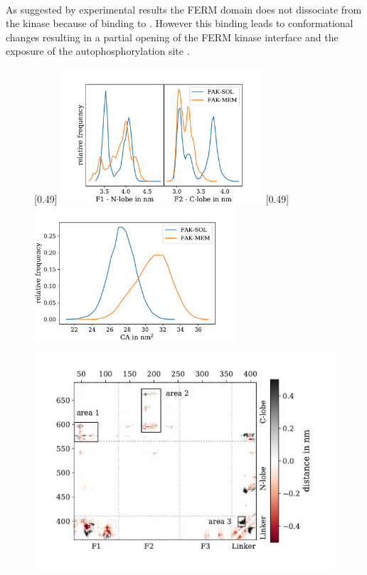 \\
As suggested by experimental results the FERM domain does not dissociate from the kinase because of binding to \pip{}. However this binding leads to conformational changes resulting in a partial opening of the FERM kinase interface and the exposure of the autophosphorylation site  \autocites{pap001}{pap003}.
%
%
%
\begin{figure}
	\subcaptionbox{\label{mem:comdist}}[0.49\textwidth]{
		\includegraphics[height=5cm]{figures/results/comp_free_mem_comdist}
	}\hfill%
	\subcaptionbox{\label{mem:contactarea}}[0.49\textwidth]{
		\includegraphics[height=5cm]{figures/results/ca_sol_mem}
	}%
\end{figure}
%
%
%
%
%
%
\begin{figure}
	\centering
	\includegraphics[width=.8\textwidth]{figures/results/contactmap_diff_to_free}
	\label{mem:contact}
\end{figure}
%
%
%
